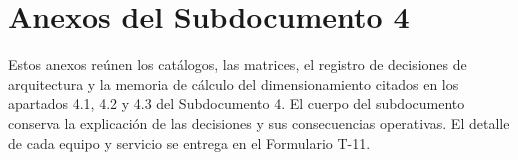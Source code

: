 
\portadalafrox
\indicelafrox
\listatablaslafrox
\setcounter{chapter}{4}
\renewcommand{\thetable}{A.\arabic{table}}
\chapter*{Anexos del Subdocumento 4}
Estos anexos reúnen los catálogos, las matrices, el registro de decisiones de arquitectura y la memoria de cálculo del dimensionamiento citados en los apartados 4.1, 4.2 y 4.3 del Subdocumento 4. El cuerpo del subdocumento conserva la explicación de las decisiones y sus consecuencias operativas. El detalle de cada equipo y servicio se entrega en el Formulario T-11.


